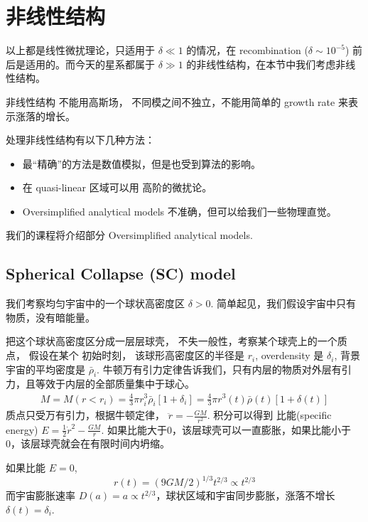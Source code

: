 \documentclass[12pt]{ctexart}
\begin{document}
\section{非线性结构}
以上都是线性微扰理论，只适用于 $\delta \ll 1$ 的情况，在 recombination ($\delta\sim 10^{-5}$) 前后是适用的。而今天的星系都属于 $\delta \gg 1$ 的非线性结构，在本节中我们考虑非线性结构。

非线性结构 不能用高斯场，  不同模之间不独立，不能用简单的 growth rate 来表示涨落的增长。

处理非线性结构有以下几种方法：
\begin{itemize}
    \item 最“精确”的方法是数值模拟，但是也受到算法的影响。
    \item 在 quasi-linear 区域可以用 高阶的微扰论。
    \item Oversimplified analytical models 不准确，但可以给我们一些物理直觉。
\end{itemize}
我们的课程将介绍部分 Oversimplified analytical models.

\subsection{Spherical Collapse (SC) model}

我们考察均匀宇宙中的一个球状高密度区 $\delta>0$. 简单起见，我们假设宇宙中只有物质，没有暗能量。

把这个球状高密度区分成一层层球壳，
不失一般性，考察某个球壳上的一个质点，
假设在某个 初始时刻， 该球形高密度区的半径是 $r_i$, overdensity 是 $\delta_i$, 背景宇宙的平均密度是 $\bar{\rho}_i$.
牛顿万有引力定律告诉我们，只有内层的物质对外层有引力，且等效于内层的全部质量集中于球心。
\begin{eqnarray}
    M=M(r<r_i)=\frac{4}{3} \pi r_{i}^{3} \bar{\rho}_{i}\left[1+\delta_{i}\right]=\frac{4}{3} \pi r^{3}(t) \bar{\rho}(t)[1+\delta(t)]
\end{eqnarray}
质点只受万有引力，根据牛顿定律， $\ddot{r}=-\frac{GM}{r^2}$. 
积分可以得到 比能(specific energy) $E=\frac{1}{2} \dot{r}^{2}-\frac{G M}{r}$. 如果比能大于0，该层球壳可以一直膨胀，如果比能小于0，该层球壳就会在有限时间内坍缩。

如果比能 $E=0$, 
\begin{equation}
    r(t)=(9 G M / 2)^{1 / 3} t^{2 / 3} \propto t^{2 / 3}
\end{equation}
而宇宙膨胀速率 $D(a) = a\propto t^{2 / 3}$，球状区域和宇宙同步膨胀，涨落不增长 $\delta(t) = \delta_i$.
\end{document}
